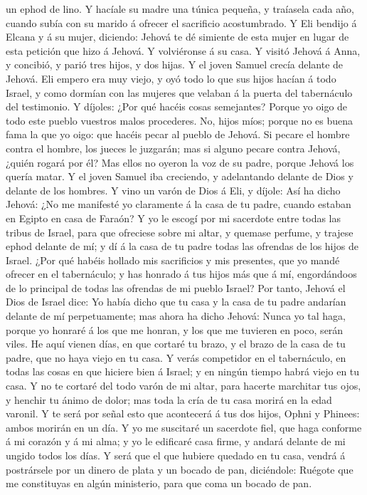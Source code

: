 un ephod de lino.  Y hacíale su madre una túnica pequeña, y
traíasela cada año, cuando subía con su marido á ofrecer el sacrificio
acostumbrado.  Y Eli bendijo á Elcana y á su mujer,
diciendo: Jehová te dé simiente de esta mujer en lugar de esta petición
que hizo á Jehová. Y volviéronse á su casa.  Y visitó
Jehová á Anna, y concibió, y parió tres hijos, y dos hijas. Y el joven
Samuel crecía delante de Jehová.  Eli empero era muy viejo,
y oyó todo lo que sus hijos hacían á todo Israel, y como dormían con las
mujeres que velaban á la puerta del tabernáculo del testimonio.
 Y díjoles: ¿Por qué hacéis cosas semejantes? Porque yo
oigo de todo este pueblo vuestros malos procederes.  No,
hijos míos; porque no es buena fama la que yo oigo: que hacéis pecar al
pueblo de Jehová.  Si pecare el hombre contra el hombre,
los jueces le juzgarán; mas si alguno pecare contra Jehová, ¿quién
rogará por él? Mas ellos no oyeron la voz de su padre, porque Jehová los
quería matar.  Y el joven Samuel iba creciendo, y
adelantando delante de Dios y delante de los hombres.  Y
vino un varón de Dios á Eli, y díjole: Así ha dicho Jehová: ¿No me
manifesté yo claramente á la casa de tu padre, cuando estaban en Egipto
en casa de Faraón?  Y yo le escogí por mi sacerdote entre
todas las tribus de Israel, para que ofreciese sobre mi altar, y quemase
perfume, y trajese ephod delante de mí; y dí á la casa de tu padre todas
las ofrendas de los hijos de Israel.  ¿Por qué habéis
hollado mis sacrificios y mis presentes, que yo mandé ofrecer en el
tabernáculo; y has honrado á tus hijos más que á mí, engordándoos de lo
principal de todas las ofrendas de mi pueblo Israel?  Por
tanto, Jehová el Dios de Israel dice: Yo había dicho que tu casa y la
casa de tu padre andarían delante de mí perpetuamente; mas ahora ha
dicho Jehová: Nunca yo tal haga, porque yo honraré á los que me honran,
y los que me tuvieren en poco, serán viles.  He aquí vienen
días, en que cortaré tu brazo, y el brazo de la casa de tu padre, que no
haya viejo en tu casa.  Y verás competidor en el
tabernáculo, en todas las cosas en que hiciere bien á Israel; y en
ningún tiempo habrá viejo en tu casa.  Y no te cortaré del
todo varón de mi altar, para hacerte marchitar tus ojos, y henchir tu
ánimo de dolor; mas toda la cría de tu casa morirá en la edad varonil.
 Y te será por señal esto que acontecerá á tus dos hijos,
Ophni y Phinees: ambos morirán en un día.  Y yo me
suscitaré un sacerdote fiel, que haga conforme á mi corazón y á mi alma;
y yo le edificaré casa firme, y andará delante de mi ungido todos los
días.  Y será que el que hubiere quedado en tu casa, vendrá
á postrársele por un dinero de plata y un bocado de pan, diciéndole:
Ruégote que me constituyas en algún ministerio, para que coma un bocado
de pan.

